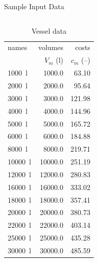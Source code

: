 \documentclass[final]{beamer}
\begin{document}
\begin{frame}[t]
\begin{columns}[t]
\begin{block}{\huge Sample Input Data}
                    \begin{columns}[t]
                    \begin{table}[t]
                        \centering
                        \normalsize
                        \caption{\large Vessel data}
                        \begin{tabular}{l | r | r}
                            names & volumes & costs\\
                            & $V_{m}$ (l) & $c_{m}$ (--)\\\hline
                            \SI{1000}{\litre} & \SI{1000.0}{} & \SI{63.10}{}\\
                            \SI{2000}{\litre} & \SI{2000.0}{} & \SI{95.64}{}\\
                            \SI{3000}{\litre} & \SI{3000.0}{} & \SI{121.98}{}\\
                            \SI{4000}{\litre} & \SI{4000.0}{} & \SI{144.96}{}\\
                            \SI{5000}{\litre} & \SI{5000.0}{} & \SI{165.72}{}\\
                            \SI{6000}{\litre} & \SI{6000.0}{} & \SI{184.88}{}\\
                            \SI{8000}{\litre} & \SI{8000.0}{} & \SI{219.71}{}\\
                            \SI{10000}{\litre} & \SI{10000.0}{} &
                            \SI{251.19}{}\\
                            \SI{12000}{\litre} & \SI{12000.0}{} &
                            \SI{280.83}{}\\
                            \SI{16000}{\litre} & \SI{16000.0}{} &
                            \SI{333.02}{}\\
                            \SI{18000}{\litre} & \SI{18000.0}{} &
                            \SI{357.41}{}\\
                            \SI{20000}{\litre} & \SI{20000.0}{} &
                            \SI{380.73}{}\\
                            \SI{22000}{\litre} & \SI{22000.0}{} &
                            \SI{403.14}{}\\
                            \SI{25000}{\litre} & \SI{25000.0}{} &
                            \SI{435.28}{}\\
                            \SI{30000}{\litre} & \SI{30000.0}{} &
                            \SI{485.59}{}\\

\end{tabular}
\end{table}
\end{columns}
\end{block}
\end{columns}
\end{frame}
\end{document}
